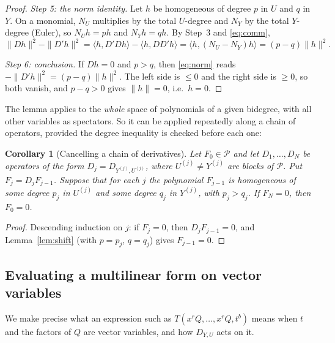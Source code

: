 \documentclass[11pt]{article}
\newtheorem{corollary}[theorem]{Corollary}
\theoremstyle{remark}
\newcommand{\D}[2]{D_{#1,#2}}
\newcommand{\PP}{\mathcal P}
\begin{document}
\begin{proof}
\emph{Step 5: the norm identity.} Let $h$ be homogeneous of degree $p$ in
$U$ and $q$ in $Y$. On a monomial, $N_U$ multiplies by the total
$U$-degree and $N_Y$ by the total $Y$-degree (Euler), so $N_Uh=ph$ and
$N_Yh=qh$. By Step~3 and \eqref{eq:comm},
\begin{equation}\label{eq:norm}
 \|Dh\|^2-\|D'h\|^2
 =\langle h,D'Dh\rangle-\langle h,DD'h\rangle
 =\langle h,(N_U-N_Y)h\rangle
 =(p-q)\|h\|^2 .
\end{equation}

\emph{Step 6: conclusion.} If $Dh=0$ and $p>q$, then \eqref{eq:norm} reads
$-\|D'h\|^2=(p-q)\|h\|^2$. The left side is $\le0$ and the right side is
$\ge0$, so both vanish, and $p-q>0$ gives $\|h\|=0$, i.e.\ $h=0$.
\end{proof}

The lemma applies to the \emph{whole} space of polynomials of a given
bidegree, with all other variables as spectators. So it can be applied
repeatedly along a chain of operators, provided the degree inequality is
checked before each one:

\begin{corollary}[Cancelling a chain of derivatives]\label{cor:peel}
Let $F_0\in\PP$ and let $D_1,\dots,D_N$ be operators of the form
$D_j=\D{Y^{(j)}}{U^{(j)}}$, where $U^{(j)}\ne Y^{(j)}$ are blocks of $\PP$.
Put $F_j=D_jF_{j-1}$. Suppose that for each $j$ the polynomial $F_{j-1}$ is
homogeneous of some degree $p_j$ in $U^{(j)}$ and some degree $q_j$ in
$Y^{(j)}$, with $p_j>q_j$. If $F_N=0$, then $F_0=0$.
\end{corollary}

\begin{proof}
Descending induction on $j$: if $F_j=0$, then $D_jF_{j-1}=0$, and
Lemma~\ref{lem:shift} (with $p=p_j$, $q=q_j$) gives $F_{j-1}=0$.
\end{proof}

\subsection{Evaluating a multilinear form on vector variables}

We make precise what an expression such as $T(x^rQ,\dots,x^rQ,t^b)$ means
when $t$ and the factors of $Q$ are vector variables, and how $\D{Y}{U}$
acts on it.
\end{document}
